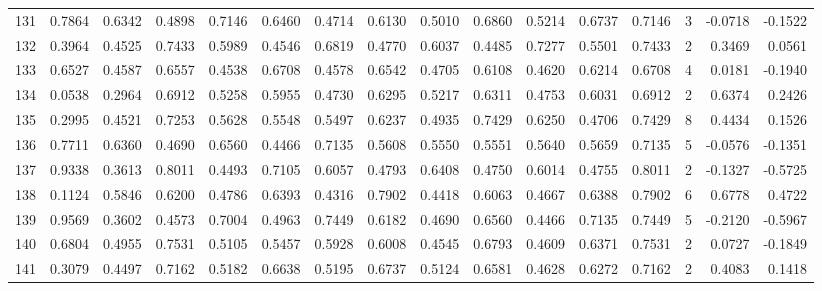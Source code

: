 \begin{tabular}{lrrrrrrrrrrrrrrr}
131 &      0.7864 &  0.6342 &  0.4898 &  0.7146 &  0.6460 &  0.4714 &  0.6130 &  0.5010 &  0.6860 &  0.5214 &   0.6737 &     0.7146 &      3 &                   -0.0718 &                    -0.1522 \\
132 &      0.3964 &  0.4525 &  0.7433 &  0.5989 &  0.4546 &  0.6819 &  0.4770 &  0.6037 &  0.4485 &  0.7277 &   0.5501 &     0.7433 &      2 &                    0.3469 &                     0.0561 \\
133 &      0.6527 &  0.4587 &  0.6557 &  0.4538 &  0.6708 &  0.4578 &  0.6542 &  0.4705 &  0.6108 &  0.4620 &   0.6214 &     0.6708 &      4 &                    0.0181 &                    -0.1940 \\
134 &      0.0538 &  0.2964 &  0.6912 &  0.5258 &  0.5955 &  0.4730 &  0.6295 &  0.5217 &  0.6311 &  0.4753 &   0.6031 &     0.6912 &      2 &                    0.6374 &                     0.2426 \\
135 &      0.2995 &  0.4521 &  0.7253 &  0.5628 &  0.5548 &  0.5497 &  0.6237 &  0.4935 &  0.7429 &  0.6250 &   0.4706 &     0.7429 &      8 &                    0.4434 &                     0.1526 \\
136 &      0.7711 &  0.6360 &  0.4690 &  0.6560 &  0.4466 &  0.7135 &  0.5608 &  0.5550 &  0.5551 &  0.5640 &   0.5659 &     0.7135 &      5 &                   -0.0576 &                    -0.1351 \\
137 &      0.9338 &  0.3613 &  0.8011 &  0.4493 &  0.7105 &  0.6057 &  0.4793 &  0.6408 &  0.4750 &  0.6014 &   0.4755 &     0.8011 &      2 &                   -0.1327 &                    -0.5725 \\
138 &      0.1124 &  0.5846 &  0.6200 &  0.4786 &  0.6393 &  0.4316 &  0.7902 &  0.4418 &  0.6063 &  0.4667 &   0.6388 &     0.7902 &      6 &                    0.6778 &                     0.4722 \\
139 &      0.9569 &  0.3602 &  0.4573 &  0.7004 &  0.4963 &  0.7449 &  0.6182 &  0.4690 &  0.6560 &  0.4466 &   0.7135 &     0.7449 &      5 &                   -0.2120 &                    -0.5967 \\
140 &      0.6804 &  0.4955 &  0.7531 &  0.5105 &  0.5457 &  0.5928 &  0.6008 &  0.4545 &  0.6793 &  0.4609 &   0.6371 &     0.7531 &      2 &                    0.0727 &                    -0.1849 \\
141 &      0.3079 &  0.4497 &  0.7162 &  0.5182 &  0.6638 &  0.5195 &  0.6737 &  0.5124 &  0.6581 &  0.4628 &   0.6272 &     0.7162 &      2 &                    0.4083 &                     0.1418 \\

\end{tabular}
